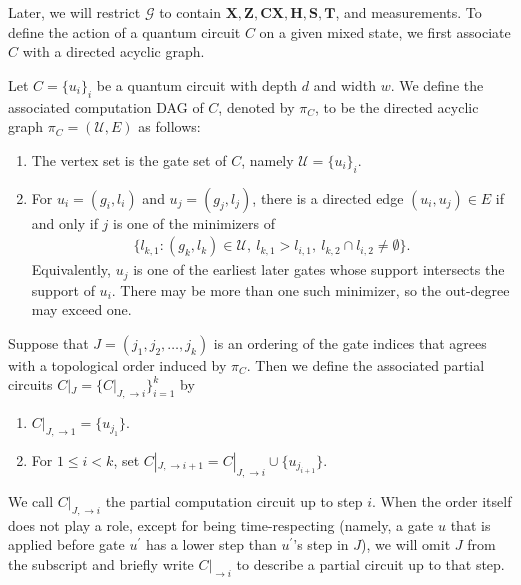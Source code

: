 Later, we will restrict $\mathcal{G}$ to contain $\mathbf{X}, \mathbf{Z}, \mathbf{CX}, \mathbf{H}, \mathbf{S}, \mathbf{T}$, and measurements. To define the action of a quantum circuit $C$ on a given mixed state, we first associate $C$ with a directed acyclic graph.
\begin{definition}
  \label{def:steps}
  Let $C=\{u_i\}_i$ be a quantum circuit with depth $d$ and width $w$. We define the associated computation DAG of $C$, denoted by $\pi_C$, to be the directed acyclic graph $\pi_C=(\mathcal{U},E)$ as follows:
  \begin{enumerate}
    \item The vertex set is the gate set of $C$, namely $\mathcal{U}=\{u_i\}_i$.
    \item For $u_i=(g_i,l_i)$ and $u_j=(g_j,l_j)$, there is a directed edge $(u_i,u_j)\in E$ if and only if $j$ is one of the minimizers of
      \begin{equation*}
        \begin{split}
          \big\{ l_{k,1} : (g_k,l_k)\in \mathcal{U},\ l_{k,1}>l_{i,1},\ l_{k,2}\cap l_{i,2}\neq\emptyset \big\}.
        \end{split}
      \end{equation*}
      Equivalently, $u_j$ is one of the earliest later gates whose support intersects the support of $u_i$. There may be more than one such minimizer, so the out-degree may exceed one.
  \end{enumerate}

  Suppose that $J=(j_1,j_2,\ldots,j_k)$ is an ordering of the gate indices that agrees with a topological order induced by $\pi_C$. Then we define the associated partial circuits $C|_J=\{C|_{J,\rightarrow i}\}_{i=1}^{k}$ by
  \begin{enumerate}
    \item $C|_{J,\rightarrow1}=\{u_{j_1}\}$.
    \item For $1\le i<k$, set $ C|_{J,\rightarrow i+1}=C|_{J,\rightarrow i}\cup\{u_{j_{i+1}}\}$.
  \end{enumerate}
We call $C|_{J,\rightarrow i}$ the partial computation circuit up to step $i$. When the order itself does not play a role, except for being time-respecting (namely, a gate $u$ that is applied before gate $u^{\prime}$ has a lower step than $u^{\prime}$'s step in $J$), we will omit $J$ from the subscript and briefly write $C|_{\rightarrow i}$ to describe a partial circuit up to that step.
\end{definition}

